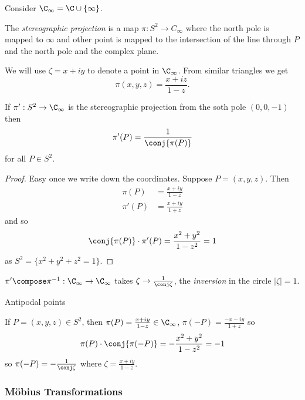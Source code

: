 \documentclass[a4paper]{article}
\theoremstyle{definition}
\begin{document}
Consider \(\C_\infty = \C \cup \{\infty\}\).

\begin{definition}
  The \emph{stereographic projection} is a map \(\pi: S^2 \to C_\infty\) where the north pole is mapped to \(\infty\) and other point is mapped to the intersection of the line through \(P\) and the north pole and the complex plane.
\end{definition}

We will use \(\zeta = x + iy\) to denote a point in \(\C_\infty\). From similar triangles we get
\[
  \pi(x, y, z) = \frac{x + iz}{1 - z}.
\]

\begin{lemma}
  If \(\pi': S^2 \to \C_\infty\) is the stereographic projection from the soth pole \((0, 0, -1)\) then
  \[
    \pi'(P) = \frac{1}{\conj{\pi(P)}}
  \]
  for all \(P \in S^2\).
\end{lemma}

\begin{proof}
  Easy once we write down the coordinates. Suppose \(P = (x, y, z)\). Then
  \begin{align*}
    \pi(P) &= \frac{x + iy}{1-z} \\
    \pi'(P) &= \frac{x + iy}{1 + z}
  \end{align*}
  and so
  \[
    \conj{\pi(P)} \cdot \pi'(P) = \frac{x^2 + y^2}{1 - z^2} = 1
  \]
  as \(S^2 = \{x^2 + y^2 + z^2 = 1\}\).
\end{proof}

\begin{note}
  \(\pi' \compose \pi^{-1}: \C_\infty \to \C_\infty\) takes \(\zeta \to \frac{1}{\conj \zeta}\), the \emph{inversion} in the circle \(|\zeta| = 1\).
\end{note}

Antipodal points

If \(P = (x, y, z) \in S^2\), then \(\pi(P) = \frac{x + iy}{1 - z} \in \C_\infty\), \(\pi(-P) = \frac{-x - iy}{1 + z}\) so
\[
  \pi(P) \cdot \conj{\pi(-P)} = -\frac{x^2 + y^2}{1 - z^2} = -1
\]
so \(\pi(-P) = -\frac{1}{\conj \zeta}\) where \(\zeta = \frac{x + iy}{1 - z}\).

\subsubsection{Möbius Transformations}
\end{document}

